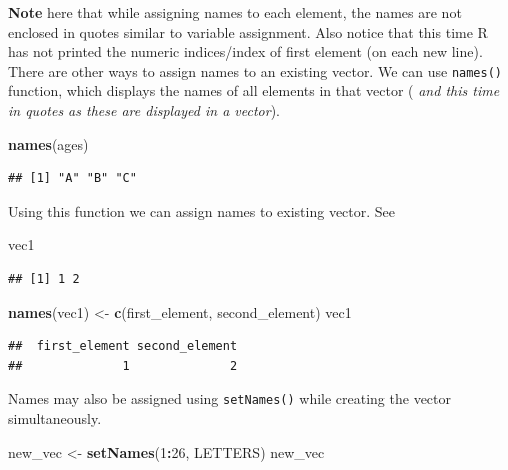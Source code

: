 \documentclass[
]{book}
\newenvironment{Shaded}{\begin{snugshade}}{\end{snugshade}}
\newcommand{\DecValTok}[1]{\textcolor[rgb]{0.00,0.00,0.81}{#1}}
\newcommand{\FunctionTok}[1]{\textcolor[rgb]{0.13,0.29,0.53}{\textbf{#1}}}
\newcommand{\NormalTok}[1]{#1}
\newcommand{\OtherTok}[1]{\textcolor[rgb]{0.56,0.35,0.01}{#1}}
\newcommand{\SpecialCharTok}[1]{\textcolor[rgb]{0.81,0.36,0.00}{\textbf{#1}}}
\newcommand{\StringTok}[1]{\textcolor[rgb]{0.31,0.60,0.02}{#1}}
\begin{document}
\textbf{Note} here that while assigning names to each element, the names are not enclosed in quotes similar to variable assignment. Also notice that this time R has not printed the numeric indices/index of first element (on each new line). There are other ways to assign names to an existing vector. We can use \texttt{names()} function, which displays the names of all elements in that vector ( \emph{and this time in quotes as these are displayed in a vector}).

\begin{Shaded}
\begin{Highlighting}[]
\FunctionTok{names}\NormalTok{(ages)}
\end{Highlighting}
\end{Shaded}

\begin{verbatim}
## [1] "A" "B" "C"
\end{verbatim}

Using this function we can assign names to existing vector. See

\begin{Shaded}
\begin{Highlighting}[]
\NormalTok{vec1}
\end{Highlighting}
\end{Shaded}

\begin{verbatim}
## [1] 1 2
\end{verbatim}

\begin{Shaded}
\begin{Highlighting}[]
\FunctionTok{names}\NormalTok{(vec1) }\OtherTok{\textless{}{-}} \FunctionTok{c}\NormalTok{(}\StringTok{\textquotesingle{}first\_element\textquotesingle{}}\NormalTok{, }\StringTok{\textquotesingle{}second\_element\textquotesingle{}}\NormalTok{)}
\NormalTok{vec1}
\end{Highlighting}
\end{Shaded}

\begin{verbatim}
##  first_element second_element 
##              1              2
\end{verbatim}

Names may also be assigned using \texttt{setNames()} while creating the vector simultaneously.

\begin{Shaded}
\begin{Highlighting}[]
\NormalTok{new\_vec }\OtherTok{\textless{}{-}} \FunctionTok{setNames}\NormalTok{(}\DecValTok{1}\SpecialCharTok{:}\DecValTok{26}\NormalTok{, LETTERS)}
\NormalTok{new\_vec}
\end{Highlighting}
\end{Shaded}
\end{document}
